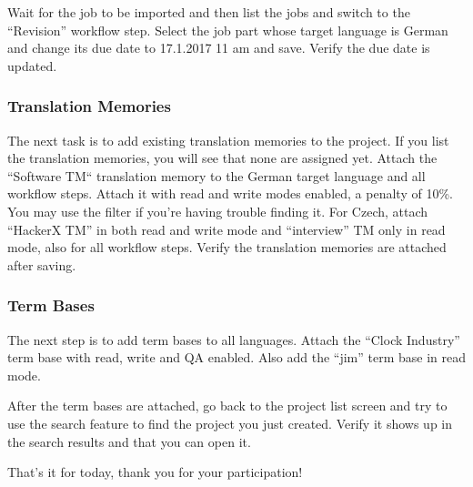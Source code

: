 Wait for the job to be imported and then list the jobs and switch to the “Revision” workflow step. Select the job part whose target language is German and change its due date to 17.1.2017 11 am and save. Verify the due date is updated.

\subsubsection{Translation Memories}

The next task is to add existing translation memories to the project. If you list the translation memories, you will see that none are assigned yet. Attach the “Software TM“ translation memory to the German target language and all workflow steps. Attach it with read and write modes enabled, a penalty of 10\%. You may use the filter if you’re having trouble finding it. For Czech, attach “HackerX TM” in both read and write mode and “interview” TM only in read mode, also for all workflow steps. Verify the translation memories are attached after saving.

\subsubsection{Term Bases}

The next step is to add term bases to all languages.
Attach the “Clock Industry” term base with read, write and QA enabled. Also add the “jim” term base in read mode. 

After the term bases are attached, go back to the project list screen and try to use the search feature to find the project you just created. Verify it shows up in the search results and that you can open it. 

That's it for today, thank you for your participation!
